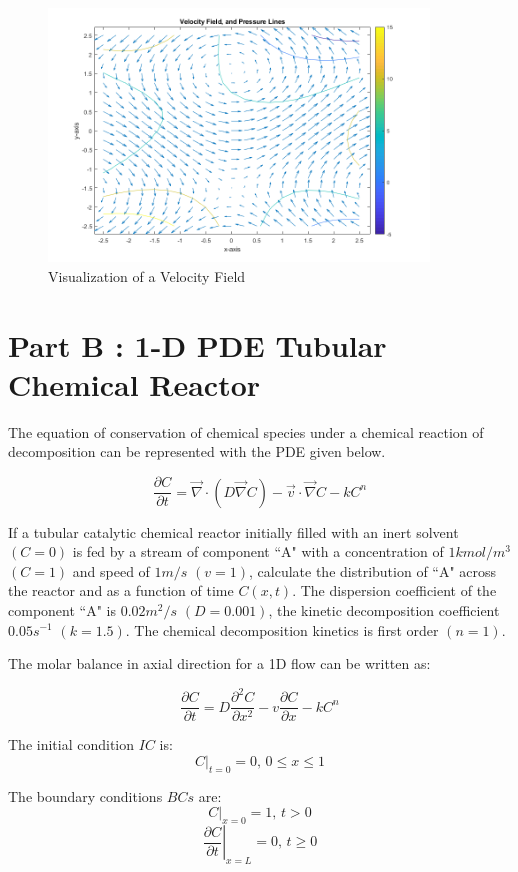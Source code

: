 \documentclass{article}
\begin{document}
\begin{figure}[h!]
	\centering
	\includegraphics[width=0.90\textwidth]{./matlab/vectorField.png}
	\caption{Visualization of a Velocity Field}
	\label{img:aVectorField}
\end{figure}


\section{Part B : 1-D PDE Tubular Chemical Reactor}

The equation of conservation of chemical species under a chemical reaction of
decomposition can be represented with the PDE given below.

$$ \frac{\partial C}{\partial t} = \vec{\nabla} \cdot (D \vec{\nabla} C) - \vec{v} \cdot \vec{\nabla} C - k C^n $$

If a tubular catalytic chemical reactor initially filled with an inert solvent $(C = 0)$ is fed by a stream of component ``A" with a concentration of $1 kmol/m^3$ $(C = 1)$ and speed of $1 m/s$ $(v = 1)$, calculate the distribution of ``A" across the reactor and as a function of time $C(x, t)$. The dispersion coefficient of the component ``A" is $0.02 m^2/s$ $(D = 0.001)$, the kinetic decomposition coefficient $0.05 s^{-1}$ $(k = 1.5)$. The chemical decomposition kinetics is first order $(n = 1)$.

The molar balance in axial direction for a 1D flow can be written as:

$$ \frac{\partial C}{\partial t} = D \frac{\partial^2 C}{\partial x^2} - v \frac{\partial C}{\partial x} - k C^n $$

The initial condition $IC$ is:
$$ \left. C \right|_{t = 0} = 0 \textrm{, } 0 \leq x \leq 1 $$

The boundary conditions $BCs$ are:
$$ \left. C \right|_{x = 0} = 1 \textrm{, } t > 0 $$
$$ \left. \frac{\partial C}{\partial t} \right|_{x = L} = 0 \textrm{, } t \geq 0 $$
\end{document}

